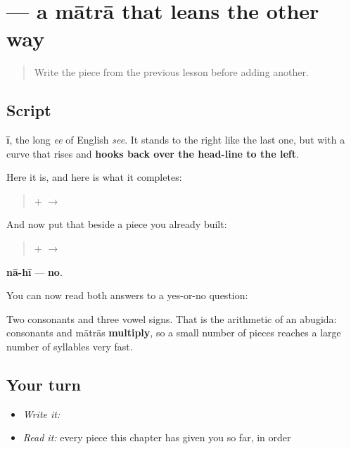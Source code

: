 \section[-ī]{ — a mātrā that leans the other way}

\label{lesson:MR-W01-ii-matra}



\begin{quote}
Write the piece from the previous lesson before adding another.
\end{quote}

\subsection*{Script}
\begin{quote}
\end{quote}

\textbf{ī}, the long \emph{ee} of English \emph{see}. It stands to the right like the last one, but with a curve that rises and \textbf{hooks back over the head-line to the left}.

Here it is, and here is what it completes:

\begin{quote}
\textbf{} + \textbf{} $\to$ \textbf{}
\end{quote}

And now put that beside a piece you already built:

\begin{quote}
\textbf{} + \textbf{} $\to$ \textbf{}
\end{quote}

\textbf{nā-hī} — \textbf{no}.

You can now read both answers to a yes-or-no question:

\begin{quote}
\textbf{}   \textbf{}
\end{quote}

Two consonants and three vowel signs. That is the arithmetic of an abugida: consonants and mātrās \textbf{multiply}, so a small number of pieces reaches a large number of syllables very fast.

\subsection*{Your turn}
\begin{itemize}
\raggedright
  \item \emph{Write it:} 
  \item \emph{Read it:} every piece this chapter has given you so far, in order
\end{itemize}

